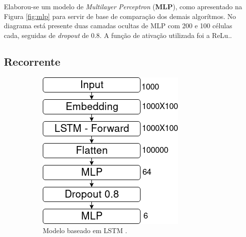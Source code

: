 Elaborou-se um modelo de \textit{Multilayer Perceptron} (\textbf{MLP}), como apresentado na Figura \ref{fig:mlp} para servir de base de comparação dos demais algorítmos. No diagrama está presente duas camadas ocultas de MLP com 200 e 100 células cada, seguidas de \textit{dropout} de 0.8. A função de ativação utilizada foi a ReLu..


\subsection{Recorrente}

\begin{figure}[ht]
    \centering
    \begin{subfigure}[b]{0.35\textwidth}
        \includegraphics[width=\textwidth]{figuras/modelos-LSTM}
        \caption{Modelo baseado em LSTM \newline \cite{hochreiter_long_1997}.}
        \label{fig:lstm}
    \end{subfigure}\hfill
    \begin{subfigure}[b]{0.4\textwidth}

\end{subfigure}
\end{figure}
